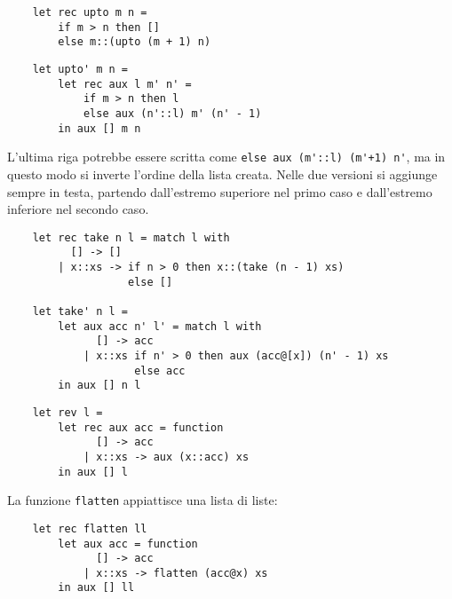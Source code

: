 \documentclass{article}
\numberwithin{equation}{subsection}
\begin{document}
\begin{verbatim}
    let rec upto m n = 
        if m > n then []
        else m::(upto (m + 1) n)
\end{verbatim}
\begin{verbatim}
    let upto' m n =
        let rec aux l m' n' =
            if m > n then l
            else aux (n'::l) m' (n' - 1)
        in aux [] m n
\end{verbatim}
L'ultima riga potrebbe essere scritta come \verb|else aux (m'::l) (m'+1) n'|, ma in questo modo si inverte l'ordine della lista creata. Nelle due versioni si aggiunge sempre in testa, partendo dall'estremo superiore nel primo caso e dall'estremo inferiore nel secondo caso. 


\begin{verbatim}
    let rec take n l = match l with
          [] -> []
        | x::xs -> if n > 0 then x::(take (n - 1) xs)
                   else []
    
    let take' n l = 
        let aux acc n' l' = match l with
              [] -> acc
            | x::xs if n' > 0 then aux (acc@[x]) (n' - 1) xs
                    else acc 
        in aux [] n l
\end{verbatim}



\begin{verbatim}
    let rev l =
        let rec aux acc = function
              [] -> acc
            | x::xs -> aux (x::acc) xs
        in aux [] l
\end{verbatim}


La funzione \verb|flatten| appiattisce una lista di liste:
\begin{verbatim}
    let rec flatten ll 
        let aux acc = function 
              [] -> acc
            | x::xs -> flatten (acc@x) xs 
        in aux [] ll
\end{verbatim}
\end{document}
